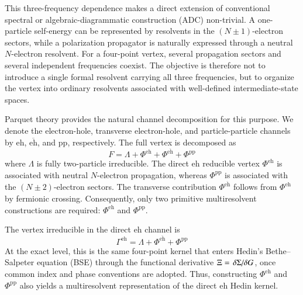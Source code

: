 \documentclass[aip,jcp,reprint,noshowkeys,superscriptaddress]{revtex4-1}
\newcommand{\eh}{\text{eh}}
\newcommand{\teh}{\overline{\text{eh}}}
\newcommand{\pp}{\text{pp}}
\begin{document}
This three-frequency dependence makes a direct extension of conventional
spectral or algebraic-diagrammatic construction (ADC) non-trivial.
A one-particle self-energy can be represented by resolvents in the
$(N\pm1)$-electron sectors, while a polarization propagator is naturally
expressed through a neutral $N$-electron resolvent.
For a four-point vertex, several propagation sectors and several independent
frequencies coexist.
The objective is therefore not to introduce a single formal resolvent
carrying all three frequencies, but to organize the vertex into ordinary
resolvents associated with well-defined intermediate-state spaces.

Parquet theory provides the natural channel decomposition for this purpose.
We denote the electron-hole, transverse electron-hole, and particle-particle
channels by $\eh$, $\teh$, and $\pp$, respectively.
The full vertex is decomposed as\cite{DeDominicis_1964b,Bickers_2004,Eckhardt2023,KuglerVonDelft2018,MarieLoos2025}
\begin{equation}
	F
	=
	\Lambda
	+
	\Phi^\eh
	+
	\Phi^{\teh}
	+
	\Phi^\pp
	\label{eq:parquet_decomposition}
\end{equation}
where $\Lambda$ is fully two-particle irreducible.
The direct $\eh$ reducible vertex $\Phi^\eh$ is associated with neutral
$N$-electron propagation, whereas $\Phi^\pp$ is associated with the
$(N\pm2)$-electron sectors.
The transverse contribution $\Phi^{\teh}$ follows from $\Phi^\eh$ by
fermionic crossing.
Consequently, only two primitive multiresolvent constructions are required:
$\Phi^\eh$ and $\Phi^\pp$.


The vertex irreducible in the direct $\eh$ channel is
\begin{equation}
	\Gamma^\eh
	=
	\Lambda
	+
	\Phi^{\teh}
	+
	\Phi^\pp
	\label{eq:Gamma_eh_parquet}
\end{equation}
At the exact level, this is the same four-point kernel that enters Hedin's
Bethe--Salpeter equation (BSE) through the functional derivative
$\Xi=\fdv*{\Sigma}{G}$, once common index and phase conventions are adopted.\cite{Hedin1965,Onida2002,StarkeKresse2012,MarieAmmarLoos2024}
Thus, constructing $\Phi^\eh$ and $\Phi^\pp$ also yields a multiresolvent
representation of the direct $\eh$ Hedin kernel.
\end{document}

